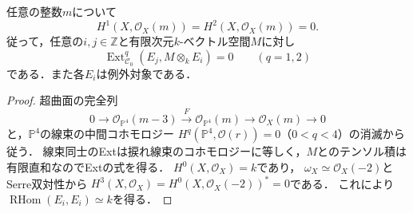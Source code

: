 \begin{lemma}[三次三様体の全捩れに対する消滅]
\label{lem:abel-cubic-acyclicity}
任意の整数$m$について
\[
 H^1(X,\mathcal O_X(m))=H^2(X,\mathcal O_X(m))=0.
\]
従って，任意の$i,j\in\mathbb Z$と有限次元$k$-ベクトル空間$M$に対し
\[
 \operatorname{Ext}^q_{\mathcal C_0}(E_j,M\otimes_k E_i)=0
 \qquad(q=1,2)
\]
である．また各$E_i$は例外対象である．
\end{lemma}
\begin{proof}
超曲面の完全列
\[
 0\longrightarrow\mathcal O_{\mathbb P^4}(m-3)
 \xrightarrow{\ F\ }\mathcal O_{\mathbb P^4}(m)
 \longrightarrow\mathcal O_X(m)\longrightarrow0
\]
と，$\mathbb P^4$の線束の中間コホモロジー
$H^q(\mathbb P^4,\mathcal O(r))=0$（$0<q<4$）の消滅から従う．
線束同士のExtは捩れ線束のコホモロジーに等しく，$M$とのテンソル積は
有限直和なのでExtの式を得る．
$H^0(X,\mathcal O_X)=k$であり，
$\omega_X\simeq\mathcal O_X(-2)$とSerre双対性から
$H^3(X,\mathcal O_X)=H^0(X,\mathcal O_X(-2))^*=0$である．
これにより$\operatorname{RHom}(E_i,E_i)\simeq k$を得る．
\end{proof}

